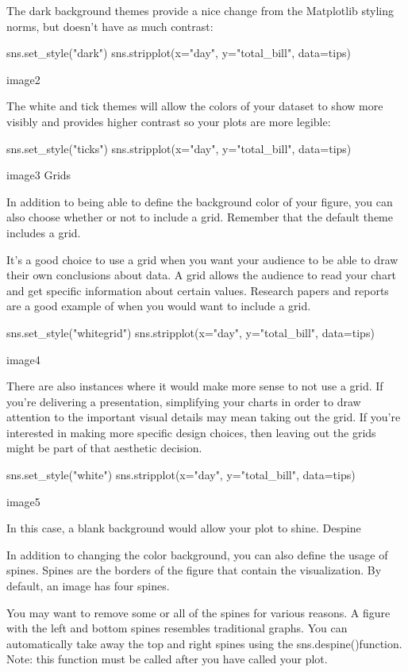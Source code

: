 \documentclass{journal}
\begin{document}
The dark background themes provide a nice change from the Matplotlib styling norms, but doesn’t have as much contrast:

sns.set_style("dark")
sns.stripplot(x="day", y="total_bill", data=tips)

image2

The white and tick themes will allow the colors of your dataset to show more visibly and provides higher contrast so your plots are more legible:

sns.set_style("ticks")
sns.stripplot(x="day", y="total_bill", data=tips)

image3
Grids

In addition to being able to define the background color of your figure, you can also choose whether or not to include a grid. Remember that the default theme includes a grid.

It’s a good choice to use a grid when you want your audience to be able to draw their own conclusions about data. A grid allows the audience to read your chart and get specific information about certain values. Research papers and reports are a good example of when you would want to include a grid.

sns.set_style("whitegrid")
sns.stripplot(x="day", y="total_bill", data=tips)

image4

There are also instances where it would make more sense to not use a grid. If you’re delivering a presentation, simplifying your charts in order to draw attention to the important visual details may mean taking out the grid. If you’re interested in making more specific design choices, then leaving out the grids might be part of that aesthetic decision.

sns.set_style("white")
sns.stripplot(x="day", y="total_bill", data=tips)

image5

In this case, a blank background would allow your plot to shine.
Despine

In addition to changing the color background, you can also define the usage of spines. Spines are the borders of the figure that contain the visualization. By default, an image has four spines.

You may want to remove some or all of the spines for various reasons. A figure with the left and bottom spines resembles traditional graphs. You can automatically take away the top and right spines using the sns.despine()function. Note: this function must be called after you have called your plot.
\end{document}

